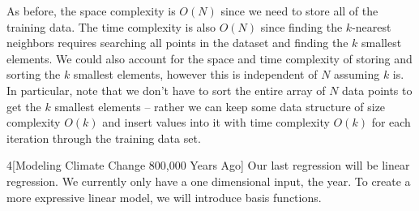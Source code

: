 \documentclass[expanded]{lkx_pset}
\begin{document}
\begin{parts}
	As before, the space complexity is $O(N)$ since we need to store all of the training data. The time complexity is also $O(N)$ since finding the $k$-nearest neighbors requires searching all points in the dataset and finding the $k$ smallest elements. We could also account for the space and time complexity of storing and sorting the $k$ smallest elements, however this is independent of $N$ assuming $k$ is. In particular, note that we don't have to sort the entire array of $N$ data points to get the $k$ smallest elements -- rather we can keep some data structure of size complexity $O(k)$ and insert values into it with time complexity $O(k)$ for each iteration through the training data set.
\end{parts}

\begin{problem}{4}[Modeling Climate Change 800,000 Years Ago]
Our last regression will be linear regression.  We currently only have
a one dimensional input, the year.  To create a more expressive linear
model, we will introduce basis functions.
\end{problem}
\end{document}
